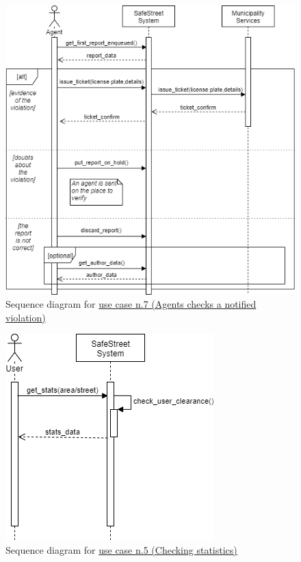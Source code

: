 \documentclass[a4paper]{report}
\begin{document}
\begin{figure}[htp]
\includegraphics[width=\textwidth]{SequenceAgentCheckReport}
\caption{Sequence diagram for \hyperref[uc:7]{use case n.7 (Agents checks a notified violation)} }
\label{fig:seq-agentcheckreport}
\end{figure}

\begin{figure}[htp]
\centering
\includegraphics[scale=0.7]{SequenceCheckStatistics}
\caption{Sequence diagram for \hyperref[uc:5]{use case n.5 (Checking statistics)} }
\label{fig:seq-checkstats}
\end{figure}
\end{document}
